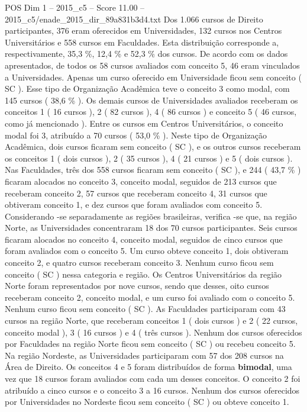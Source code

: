 \begin{textsample}{POS Dim 1 – 2015\_c5 – Score 11.00 – 2015\_c5/enade\_2015\_dir\_89a831b3d4.txt}
Dos 1.066 cursos de Direito participantes, 376 eram oferecidos em Universidades, 132 cursos nos Centros Universitários e 558 cursos em Faculdades.
Esta distribuição corresponde a, respectivamente, 35,3 \%, 12,4 \% e 52,3 \% dos cursos.
De acordo com os dados apresentados, de todos os 58 cursos avaliados com conceito 5, 46 eram vinculados a Universidades.
Apenas um curso oferecido em Universidade ficou sem conceito ( SC ).
Esse tipo de Organização Acadêmica teve o conceito 3 como modal, com 145 cursos ( 38,6 \% ).
Os demais cursos de Universidades avaliados receberam os conceitos 1 ( 16 cursos ), 2 ( 82 cursos ), 4 ( 86 cursos ) e conceito 5 ( 46 cursos, como já mencionado ).
Entre os cursos em Centros Universitários, o conceito modal foi 3, atribuído a 70 cursos ( 53,0 \% ).
Neste tipo de Organização Acadêmica, dois cursos ficaram sem conceito ( SC ), e os outros cursos receberam os conceitos 1 ( dois cursos ), 2 ( 35 cursos ), 4 ( 21 cursos ) e 5 ( dois cursos ).
Nas Faculdades, três dos 558 cursos ficaram sem conceito ( SC ), e 244 ( 43,7 \% ) ficaram alocados no conceito 3, conceito modal, seguidos de 213 cursos que receberam conceito 2, 57 cursos que receberam conceito 4, 31 cursos que obtiveram conceito 1, e dez cursos que foram avaliados com conceito 5.
Considerando -se separadamente as regiões brasileiras, verifica -se que, na região Norte, as Universidades concentraram 18 dos 70 cursos participantes.
Seis cursos ficaram alocados no conceito 4, conceito modal, seguidos de cinco cursos que foram avaliados com o conceito 5.
Um curso obteve conceito 1, dois obtiveram conceito 2, e quatro cursos receberam conceito 3.
Nenhum curso ficou sem conceito ( SC ) nessa categoria e região.
Os Centros Universitários da região Norte foram representados por nove cursos, sendo que desses, oito cursos receberam conceito 2, conceito modal, e um curso foi avaliado com o conceito 5.
Nenhum curso ficou sem conceito ( SC ).
As Faculdades participaram com 43 cursos na região Norte, que receberam conceitos 1 ( dois cursos ) e 2 ( 22 cursos, conceito modal ), 3 ( 16 cursos ) e 4 ( três cursos ).
Nenhum dos cursos oferecidos por Faculdades na região Norte ficou sem conceito ( SC ) ou recebeu conceito 5.
Na região Nordeste, as Universidades participaram com 57 dos 208 cursos na Área de Direito.
Os conceitos 4 e 5 foram distribuídos de forma \textbf{bimodal}, uma vez que 18 cursos foram avaliados com cada um desses conceitos.
O conceito 2 foi atribuído a cinco cursos e o conceito 3 a 16 cursos.
Nenhum dos cursos oferecidos por Universidades no Nordeste ficou sem conceito ( SC ) ou obteve conceito 1.

\end{textsample}
